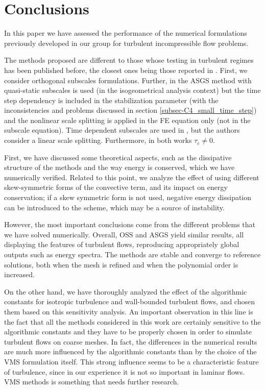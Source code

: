 \section{Conclusions}
\label{sec-C4_conclusions}

In this paper we have assessed the performance of the numerical formulations previously developed in our group \cite{codina_stabilized_2002,codina_time_2007,Codina-chap-2011,principe_dissipative_2010} for turbulent incompressible flow problems. 

The methods proposed are different to those whose testing in turbulent regimes has been published before, the closest ones being those reported in \cite{bazilevs_variational_2007,gamnitzer_time-dependent_2010}. First, we consider orthogonal subscales formulations. Further, in \cite{bazilevs_variational_2007} the ASGS method with quasi-static subscales is used (in the isogeometrical analysis context) but the time step dependency is included in the stabilization parameter (with the inconsistencies and problems discussed in section \ref{subsec-C4_small_time_step}) and the nonlinear scale splitting is applied in the FE equation only (not in the subscale equation). Time dependent subscales are used in \cite{gamnitzer_time-dependent_2010}, but the authors consider a linear scale splitting. Furthermore, in both works $\tau_c \neq 0$. 

First, we have discussed some theoretical aspects, such as the dissipative structure of the methods and the way energy is conserved, which we have numerically verified. Related to this point, we analyze the effect of using different skew-symmetric forms of the convective term, and its impact on energy conservation; if a skew symmetric form is not used, negative energy dissipation can be introduced to the scheme, which may be a source of instability. 

However, the most important conclusions come from the different problems that we have solved numerically. Overall, OSS and ASGS yield similar results, all displaying the features of turbulent flows, reproducing appropriately global outputs such as energy spectra. The methods are stable and converge to reference solutions, both when the mesh is refined and when the polynomial order is increased. 

On the other hand, we have thoroughly analyzed the effect of the algorithmic constants for isotropic turbulence and wall-bounded turbulent flows, and chosen them based on this sensitivity analysis. An important observation in this line is the fact that all the methods considered in this work are certainly sensitive to the algorithmic constants and they have to be properly chosen in order to simulate turbulent flows on coarse meshes. In fact, the differences in the numerical results are much more influenced by the algorithmic constants than by the choice of the VMS formulation itself.  This strong influence seems to be a characteristic feature of turbulence, since in our experience it is not so important in laminar flows. VMS methods is something that needs further research.

